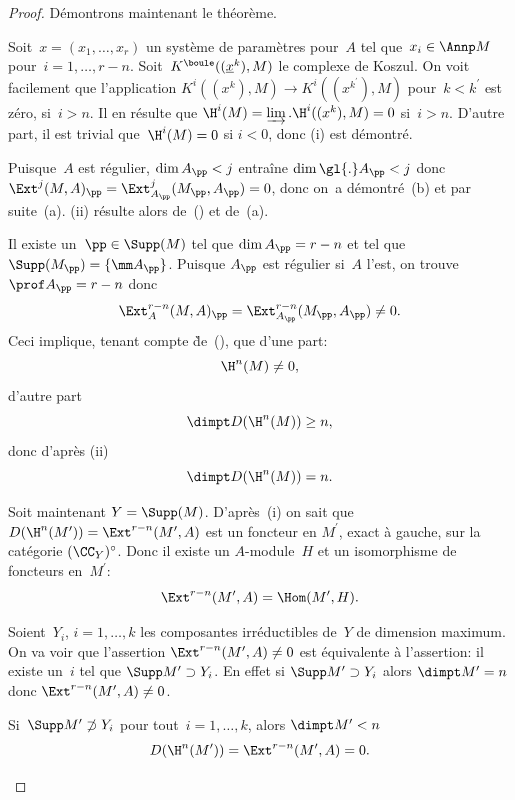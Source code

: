 \begin{proof}
D\'emontrons maintenant le th\'eor\`eme.
\begin{enumeratei}
\item
Soit~$x=(x_{1},\dots, x_{r})$ un syst\`eme de param\`etres pour~$A$ tel que~$x_{i}\in\Annp M$ pour~$i=1,\dots, r-n$. Soit~$K^{\boule}((\underline{x}^{k}), M)$ le complexe de Koszul. On voit facilement que l'application $K^{i}((x^{k}), M)\to K^{i}((x^{k^{\prime}}), M)$ pour~$k<k^{\prime}$ est z\'ero, si~$i>n$. Il en r\'esulte que $\H^{i}(M)=\varinjlim.\H^{i}((x^{k}), M)=0$ si~$i>n$. D'autre part, il est trivial que~$\H^{i}(M)=0$ si $i<0$, donc (i) est d\'emontr\'e.

\item
Puisque~$A$ est r\'egulier, $\dim A_{\pp}<j$ entra\^ine $\dim\gl{.}A_{\pp}<j$ donc $\Ext^{j}(M, A)_{\pp}=\Ext_{A_{\pp}}^{j}(M_{\pp}, A_{\pp})=\nobreak0$, donc on~a d\'emontr\'e~(b) et par suite~(a). (ii) r\'esulte alors de~() et de~(a).

\item
Il existe un~$\pp\in\Supp(M)$ tel que $\dim A_{\pp}=r-n$ et tel que $\Supp(M_{\pp})=\{ \mm A_{\pp}\}$. Puisque $A_{\pp}$ est r\'egulier si~$A$ l'est, on trouve $\prof A_{\pp}=r-n$ donc
\begin{equation} \label{eq:V.23} \Ext_{A}^{r-n}(M, A)_{\pp}=\Ext_{A_{\pp}}^{r-n}(M_{\pp}, A_{\pp})\neq 0.
\end{equation}
Ceci implique\pageoriginale, tenant compte \`{de}~(), que d'une part:
$$
\H^{n}(M)\neq 0,
$$
d'autre part
$$
\dimpt D(\H^{n}(M))\geq n,
$$
donc d'apr\`es (ii)
$$
\dimpt D(\H^{n}(M))=n.
$$

Soit maintenant $Y=\Supp(M)$. D'apr\`es~(i) on sait que $D(\H^{n}(M^{\prime}))=\Ext^{r-n}(M^{\prime}, A)$ est un foncteur en $M^{\prime}$, exact \`a gauche, sur la cat\'egorie $(\CC_{Y})^{\circ}$. Donc il existe un $A$-module~$H$ et un isomorphisme de foncteurs en~$M^{\prime}$:
$$
\Ext^{r-n}(M^{\prime}, A)=\Hom(M^{\prime}, H).
$$

Soient~$Y_{i}$, $i=1,\dots, k$ les composantes irr\'eductibles de~$Y$ de dimension maximum. On va voir que l'assertion $\Ext^{r-n}(M^{\prime}, A)\neq 0$ est \'equivalente \`a l'assertion: il existe un~$i$ tel que $\Supp M^{\prime}\supset Y_{i}$. En effet si $\Supp M^{\prime}\supset Y_{i}$ alors $\dimpt M^{\prime}=n$ donc $\Ext^{r-n}(M^{\prime}, A)\neq 0$.

Si~$\Supp M^{\prime}\not\supset Y_{i}$ pour tout~$i=1,\dots, k$, alors $\dimpt M^{\prime}<n$
$$D(\H^{n}(M^{\prime}))=\Ext^{r-n}(M^{\prime}, A)=0.
$$


\end{enumeratei}
\end{proof}
